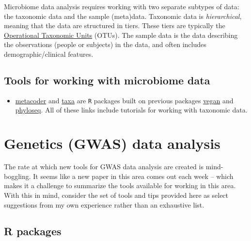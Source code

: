 \documentclass[
]{book}
\providecommand{\tightlist}{%
  \setlength{\itemsep}{0pt}\setlength{\parskip}{0pt}}
\begin{document}
Microbiome data analysis requires working with two separate subtypes of data: the taxonomic data and the sample (meta)data. Taxonomic data is \emph{hierarchical}, meaning that the data are structured in tiers. These tiers are typically the \href{https://en.wikipedia.org/wiki/Operational_taxonomic_unit}{Operational Taxonomic Units} (OTUs). The sample data is the data describing the observations (people or subjects) in the data, and often includes demographic/clinical features.

\hypertarget{tools-for-working-with-microbiome-data}{%
\section{Tools for working with microbiome data}\label{tools-for-working-with-microbiome-data}}

\begin{itemize}
\tightlist
\item
  \href{https://grunwaldlab.github.io/metacoder_documentation/}{metacoder} and \href{https://docs.ropensci.org/taxa/}{taxa} are \texttt{R} packages built on previous packages \href{https://peat-clark.github.io/BIO381/veganTutorial.html}{vegan} and \href{https://vaulot.github.io/tutorials/Phyloseq_tutorial.html\#phyloseq-r-library}{phyloseq}. All of these links include tutorials for working with taxonomic data.
\end{itemize}

\hypertarget{genetics-gwas-data-analysis}{%
\chapter{Genetics (GWAS) data analysis}\label{genetics-gwas-data-analysis}}

The rate at which new tools for GWAS data analysis are created is mind-boggling. It seems like a new paper in this area comes out each week -- which makes it a challenge to summarize the tools available for working in this area. With this in mind, consider the set of tools and tips provided here as select suggestions from my own experience rather than an exhaustive list.

\hypertarget{r-packages}{%
\section{R packages}\label{r-packages}}
\end{document}
